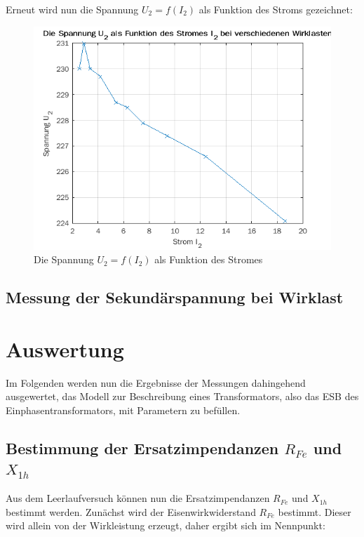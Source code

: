 \documentclass{article}
\begin{document}
Erneut wird nun die Spannung $U_{2} = f(I_{2})$ als Funktion des Stroms gezeichnet:

\begin{figure}[h]
  \centering
  \includegraphics[width=\textwidth]{../assets/images/gep3/i2_u2.png}
  \caption{Die Spannung $U_2 = f(I_2)$ als Funktion des Stromes}
  \label{fig:u2i2}
\end{figure}

\subsection{Messung der Sekundärspannung bei Wirklast}
\label{sec:mess-der-sekund}

\section{Auswertung}
\label{sec:auswertung}

Im Folgenden werden nun die Ergebnisse der Messungen dahingehend ausgewertet, das Modell zur Beschreibung eines Transformators, also das ESB des Einphasentransformators, mit Parametern zu befüllen.


\subsection{Bestimmung der Ersatzimpendanzen $R_{Fe}$ und $X_{1h}$}
\label{sec:best-der-ersatz}

Aus dem Leerlaufversuch können nun die Ersatzimpendanzen $R_{Fe}$ und $X_{1h}$ bestimmt werden. Zunächst wird der Eisenwirkwiderstand $R_{Fe}$ bestimmt. Dieser wird allein von der Wirkleistung erzeugt, daher ergibt sich im Nennpunkt:
\end{document}
